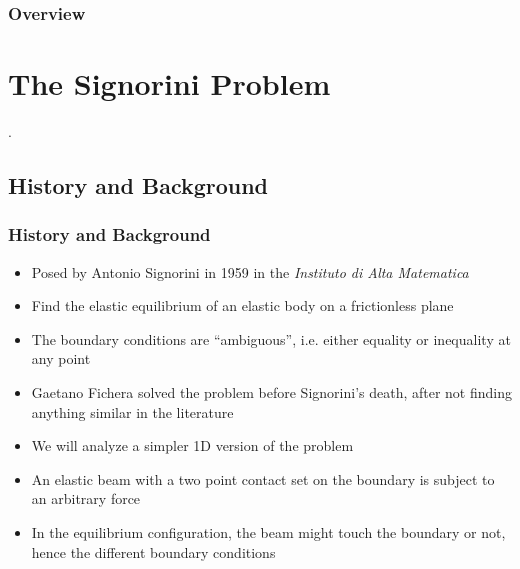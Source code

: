 \begin{frame}
	\frametitle{Overview}
	\vspace{1cm}
	\begin{minipage}[s]{\textwidth}
	\tableofcontents
	\end{minipage}
\end{frame}

\section{The Signorini Problem}
\PraesentationMasterWeissBlau
\begin{frame}
	\centering
	\vspace{6cm}
	\huge{\thesection . \secname}
\end{frame}
\PraesentationMasterStandard

\subsection{History and Background}
\begin{frame}
	\frametitle{History and Background}	
	\begin{itemize}
		\item Posed by Antonio Signorini in 1959 in the \textit{Instituto di Alta Matematica}
		\item Find the elastic equilibrium of an elastic body on a frictionless plane
		\item The boundary conditions are ``ambiguous'', i.e. either equality or inequality at any point
		\item Gaetano Fichera solved the problem before Signorini's death, after not finding anything similar in the literature
	\end{itemize}

\begin{itemize}
	\item We will analyze a simpler 1D version of the problem
	\item An elastic beam with a two point contact set on the boundary is subject to an arbitrary force
	\item In the equilibrium configuration, the beam might touch the boundary or not, hence the different boundary conditions
\end{itemize}
\end{frame}

